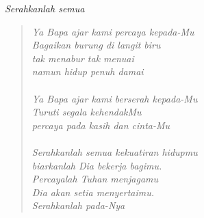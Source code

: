\begin{center}
\itshape{Serahkanlah semua}
\end{center}

\small
\begin{verse}
\itshape{
Ya Bapa ajar kami percaya kepada-Mu\\
Bagaikan burung di langit biru\\ 
tak menabur tak menuai\\ 
namun hidup penuh damai\\
{~}\\
Ya Bapa ajar kami berserah kepada-Mu\\
Turuti segala kehendakMu\\
percaya pada kasih dan cinta-Mu\\
{~}\\
Serahkanlah semua kekuatiran hidupmu\\ 
biarkanlah Dia bekerja bagimu.\\
Percayalah Tuhan menjagamu\\
Dia akan setia menyertaimu.
{~}\\
Serahkanlah pada-Nya
}
\end{verse}
\normalsize